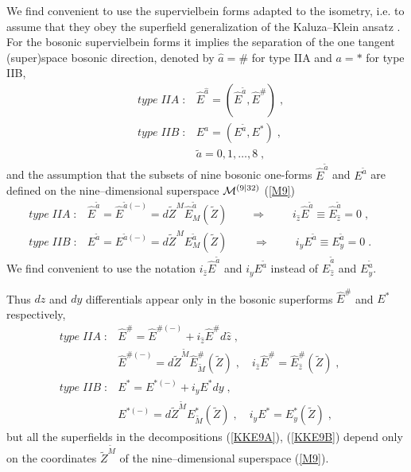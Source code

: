 \documentclass[a4paper,11pt]{article}
\begin{document}
We find convenient to use the supervielbein forms adapted to the 
isometry, i.e. to assume that they obey the 
superfield generalization  of the Kaluza--Klein ansatz 
\cite{ansatz}.  
For the bosonic supervielbein forms it implies the separation of 
the one tangent (super)space bosonic direction, denoted by 
$\hat{a}=\#$ for type IIA and $a= *$ for type IIB,  
 \begin{eqnarray}\label{EaIIAd}
& type \; IIA \; : & \hat{E}^{\hat{a}}= (\hat{E}^{\tilde{a}}, \hat{E}^{\#}) 
\; , 
\\ \label{EaIIBd} & type \; IIB \; : & 
E^a = ({E}^{\tilde{a}}, {E}^{*}) \; , 
\\ \nonumber && \tilde{a}=0,1, \ldots , 8 \; ,
\end{eqnarray}
and the assumption that the subsets of nine bosonic one-forms 
$\hat{E}^{\tilde{a}}$ and ${E}^{\tilde{a}}$ are defined on the 
nine--dimensional superspace ${\cal M}^{(9|32)}$ (\ref{M9}) 
\begin{eqnarray}\label{KKEaA}
& type \; IIA \; : & 
\hat{E}^{ {\tilde{a}}}= \hat{E}^{ {\tilde{a}}(-)}=
d\tilde{Z}^M \hat{E}^{ {\tilde{a}}}_M(\tilde{Z}) \qquad 
\Rightarrow \qquad \; 
i_{\hat{z}}\hat{E}^{ {\tilde{a}}}\equiv\hat{E}_{\hat{z}}^{ {\tilde{a}}} =0 
\; , \qquad 
\\ \label{KKEaB}
& type \; IIB  \; : & 
{E}^{ {\tilde{a}}}= {E}^{ {\tilde{a}}(-)} = 
d\tilde{Z}^M  {E}^{ {\tilde{a}}}_M(\tilde{Z}) \;  \qquad 
\Rightarrow  \qquad  \; 
i_{y}{E}^{ {\tilde{a}}}\equiv {E}_{y}^{ {\tilde{a}}} =0  \; . \qquad 
\end{eqnarray}
We find convenient to use the notation  
$i_{\hat{z}}\hat{E}^{{\tilde{a}}}$ and $i_{y}{E}^{ {\tilde{a}}}$ instead of 
$\hat{E}_{\hat{z}}^{{\tilde{a}}}$ and ${E}_{y}^{ {\tilde{a}}}$. 

Thus $d\hat{z}$ and $dy$ differentials appear only in the bosonic superforms 
$\hat{E}^{\#}$ and $E^*$ respectively, 
\begin{eqnarray}\label{KKE9A}
& type \; IIA  \; : & 
\hat{E}^{\#}= 
\hat{E}^{\# (-)}+ i_{\hat{z}}\hat{E}^{\#} d\hat{z} \; , 
\quad 
\nonumber \\ && 
\hat{E}^{\# (-)}=d\tilde{Z}^{\tilde{M}} \hat{E}_{\tilde{M}}^{\#}
(\tilde{Z})\; , \quad  
 i_{\hat{z}}\hat{E}^{\#} = 
\hat{E}_{\hat{z}}^{\#}(\tilde{Z})\; , \qquad 
\\ \label{KKE9B}
& type \; IIB  \; : & 
{E}^{*}= {E}^{*(-)} + i_yE^* dy \; , \quad 
 \nonumber \\ && 
{E}^{*(-)}= 
d\tilde{Z}^{\tilde{M}} {E}_{\tilde{M}}^{*}(\tilde{Z}) \; , \quad 
i_{y}{E}^{*}=E_y^*(\tilde{Z})  \; , \qquad 
\end{eqnarray}
but all the superfields in the decompositions (\ref{KKE9A}), (\ref{KKE9B}) 
depend only on the coordinates $\tilde{Z}^{\tilde{M}}$  of the 
nine--dimensional superspace (\ref{M9}). 
\end{document}
